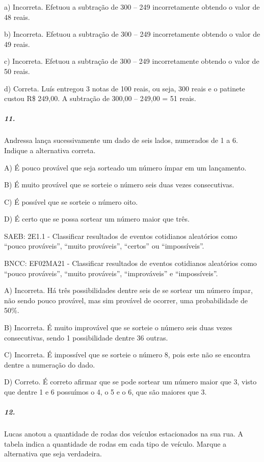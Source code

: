 a) Incorreta. Efetuou a subtração de 300 -- 249 incorretamente obtendo o
valor de 48 reais.

b) Incorreta. Efetuou a subtração de 300 -- 249 incorretamente obtendo o
valor de 49 reais.

c) Incorreta. Efetuou a subtração de 300 -- 249 incorretamente obtendo o
valor de 50 reais.

d) Correta. Luís entregou 3 notas de 100 reais, ou seja, 300 reais e o
patinete custou R\$ 249,00. A subtração de 300,00 -- 249,00 = 51 reais.

\subparagraph{11. }\label{section-155}

Andressa lança sucessivamente um dado de seis lados, numerados de 1 a 6.
Indique a alternativa correta.

A) É pouco provável que seja sorteado um número ímpar em um lançamento.

B) É muito provável que se sorteie o número seis duas vezes
consecutivas.

C) É possível que se sorteie o número oito.

D) É certo que se possa sortear um número maior que três.

SAEB: 2E1.1 - Classificar resultados de eventos cotidianos aleatórios
como ``pouco prováveis'', ``muito prováveis'', ``certos'' ou
``impossíveis''.

BNCC: EF02MA21 - Classificar resultados de eventos cotidianos aleatórios
como ``pouco prováveis'', ``muito prováveis'', ``improváveis'' e
``impossíveis''.

A) Incorreta. Há três possibilidades dentre seis de se sortear um número
ímpar, não sendo pouco provável, mas sim provável de ocorrer, uma
probabilidade de 50\%.

B) Incorreta. É muito improvável que se sorteie o número seis duas vezes
consecutivas, sendo 1 possibilidade dentre 36 outras.

C) Incorreta. É impossível que se sorteie o número 8, pois este não se
encontra dentre a numeração do dado.

D) Correto. É correto afirmar que se pode sortear um número maior que 3,
visto que dentre 1 e 6 possuímos o 4, o 5 e o 6, que são maiores que 3.

\subparagraph{12. }\label{section-156}

Lucas anotou a quantidade de rodas dos veículos estacionados na sua rua.
A tabela indica a quantidade de rodas em cada tipo de veículo. Marque a
alternativa que seja verdadeira.

